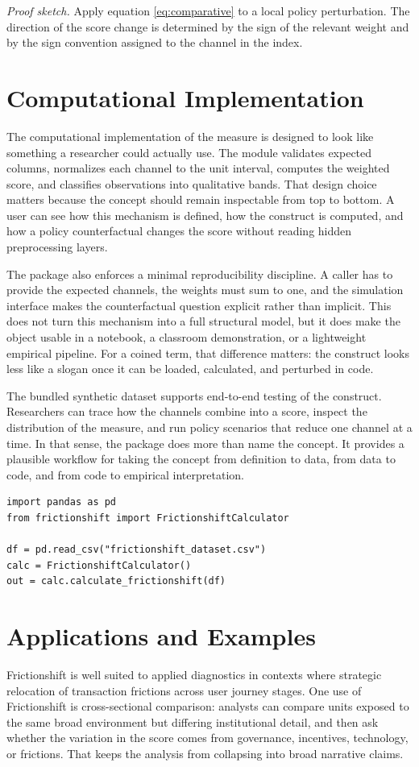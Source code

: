 \documentclass[12pt]{article}
\begin{document}
\textit{Proof sketch.} Apply equation \eqref{eq:comparative} to a local policy perturbation. The direction of the score change is determined by the sign of the relevant weight and by the sign convention assigned to the channel in the index.

\section{Computational Implementation}
The computational implementation of the measure is designed to look like something a researcher could actually use. The module validates expected columns, normalizes each channel to the unit interval, computes the weighted score, and classifies observations into qualitative bands. That design choice matters because the concept should remain inspectable from top to bottom. A user can see how this mechanism is defined, how the construct is computed, and how a policy counterfactual changes the score without reading hidden preprocessing layers.

The package also enforces a minimal reproducibility discipline. A caller has to provide the expected channels, the weights must sum to one, and the simulation interface makes the counterfactual question explicit rather than implicit. This does not turn this mechanism into a full structural model, but it does make the object usable in a notebook, a classroom demonstration, or a lightweight empirical pipeline. For a coined term, that difference matters: the construct looks less like a slogan once it can be loaded, calculated, and perturbed in code.

The bundled synthetic dataset supports end-to-end testing of the construct. Researchers can trace how the channels combine into a score, inspect the distribution of the measure, and run policy scenarios that reduce one channel at a time. In that sense, the package does more than name the concept. It provides a plausible workflow for taking the concept from definition to data, from data to code, and from code to empirical interpretation.

\begin{verbatim}
import pandas as pd
from frictionshift import FrictionshiftCalculator

df = pd.read_csv("frictionshift_dataset.csv")
calc = FrictionshiftCalculator()
out = calc.calculate_frictionshift(df)
\end{verbatim}

\section{Applications and Examples}
Frictionshift is well suited to applied diagnostics in contexts where strategic relocation of transaction frictions across user journey stages. One use of Frictionshift is cross-sectional comparison: analysts can compare units exposed to the same broad environment but differing institutional detail, and then ask whether the variation in the score comes from governance, incentives, technology, or frictions. That keeps the analysis from collapsing into broad narrative claims.
\end{document}
